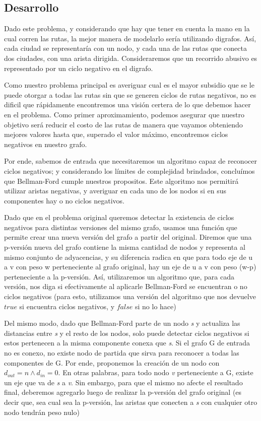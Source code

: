 \subsection{Desarrollo}
Dado este problema, y considerando que hay que tener en cuenta la mano en la cual corren las rutas, la mejor manera de modelarlo sería utilizando digrafos. Así, cada ciudad se representaría con un nodo, y cada una de las rutas que conecta dos ciudades, con una arista dirigida. Consideraremos que un recorrido abusivo es representado por un ciclo negativo en el digrafo.

Como nuestro problema principal es averiguar cual es el mayor subsidio que se le puede otorgar a todas las rutas sin que se generen ciclos de rutas negativos, no es dificil que rápidamente encontremos una visión certera de lo que debemos hacer en el problema. Como primer aproximamiento, podemos asegurar que nuestro objetivo será reducir el costo de las rutas de manera que vayamos obteniendo mejores valores hasta que, superado el valor máximo, encontremos ciclos negativos en nuestro grafo.

Por ende, sabemos de entrada que necesitaremos un algoritmo capaz de reconocer ciclos negativos; y considerando los límites de complejidad brindados, concluímos que Bellman-Ford cumple nuestros propositos. Este algoritmo nos permitirá utilizar aristas negativas, y averiguar en cada uno de los nodos si en sus componentes hay o no ciclos negativos.

Dado que en el problema original queremos detectar la existencia de ciclos negativos para distintas versiones del mismo grafo, usamos una función que permite crear una nueva versión del grafo a partir del original. Diremos que una p-versión nueva del grafo contiene la misma cantidad de nodos y representa al mismo conjunto de adyacencias, y su diferencia radica en que para todo eje de u a v con peso w perteneciente al grafo original, hay un eje de u a v con peso (w-p) perteneciente a la p-versión. Así, utilizaremos un algoritmo que, para cada versión, nos diga si efectivamente al aplicarle Bellman-Ford se encuentran o no ciclos negativos (para esto, utilizamos una versión del algoritmo que nos devuelve $true$ si encuentra ciclos negativos, y $false$ si no lo hace)

Del mismo modo, dado que Bellman-Ford parte de un nodo \textit{s} y actualiza las distancias entre \textit{s} y el resto de los nodos, solo puede detectar ciclos negativos si estos pertenecen a la misma componente conexa que \textit{s}. Si el grafo G de entrada no es conexo, no existe nodo de partida que sirva para reconocer a todas las componentes de G. Por ende, proponemos la creación de un nodo con $d_{out} = n \land d_{in} = 0$. En otras palabras, para todo nodo \textit{v} perteneciente a G, existe un eje que va de \textit{s} a \textit{v}. Sin embargo, para que el mismo no afecte el resultado final, deberemos agregarlo luego de realizar la p-versión del grafo original (es decir que, sea cual sea la p-versión, las aristas que conecten a \textit{s} con cualquier otro nodo tendrán peso nulo)


